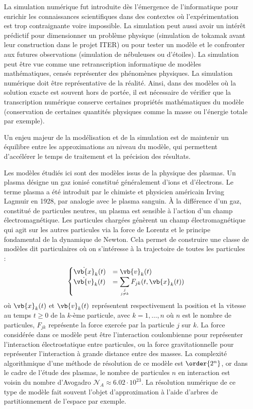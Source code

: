 
La simulation numérique fut introduite dès l’émergence de l’informatique pour enrichir les connaissances scientifiques dans des contextes où l’expérimentation est trop contraignante voire impossible. La simulation peut aussi avoir un intérêt prédictif pour dimensionner un problème physique (simulation de tokamak avant leur construction dans le projet ITER) ou pour tester un modèle et le confronter aux futures observations (simulation de nébuleuses ou d’étoiles). La simulation peut être vue comme une retranscription informatique de modèles mathématiques, censés représenter des phénomènes physiques. La simulation numérique doit être représentative de la réalité. Ainsi, dans des modèles où la solution exacte est souvent hors de portée, il est nécessaire de vérifier que la transcription numérique conserve certaines propriétés mathématiques du modèle (conservation de certaines quantités physiques comme la masse ou l’énergie totale par exemple).

Un enjeu majeur de la modélisation et de la simulation est de maintenir un équilibre entre les approximations au niveau du modèle, qui permettent d’accélérer le temps de traitement et la précision des résultats.

Les modèles étudiés ici sont des modèles issus de la physique des plasmas. Un plasma désigne un gaz ionisé constitué généralement d'ions et d'électrons. Le terme plasma a été introduit par le chimiste et physicien américain Irving Lagmuir en 1928, par analogie avec le plasma sanguin. À la différence d'un gaz, constitué de particules neutres, un plasma est sensible à l'action d'un champ électromagnétique. Les particules chargées génèrent un champ électromagnétique qui agit sur les autres particules via la force de Lorentz et le principe fondamental de la dynamique de Newton. Cela permet de construire une classe de modèles dit particulaires où on s'intéresse à la trajectoire de toutes les particules :
$$
  \begin{cases}
    \dot{\vb{x}}_k(t) &= \vb{v}_k(t) \\
    \dot{\vb{v}}_k(t) &= \displaystyle\sum_{j\atop j\neq k} F_{jk}(t,\vb{x}_k(t))
  \end{cases}
$$
où $\vb{x}_k(t)$ et $\vb{v}_k(t)$ représentent respectivement la position et la vitesse au temps $t\geq0$ de la $k$-ème particule, avec $k=1,\dots,n$ où $n$ est le nombre de particules, $F_{jk}$ représente la force exercée par la particule $j$ sur $k$. La force considérée dans ce modèle peut être l'interaction coulombienne pour représenter l'interaction électrostatique entre particules, ou la force gravitationnelle pour représenter l'interaction à grande distance entre des masses. La complexité algorithmique d'une méthode de résolution de ce modèle est $\order{2^n}$, or dans le cadre de l'étude des plasmas, le nombre de particules $n$ en interaction est voisin du nombre d'Avogadro $\mathcal{N}_A\approx 6.02\cdot 10^{23}$. La résolution numérique de ce type de modèle fait souvent l'objet d'approximation à l'aide d'arbres de partitionnement de l'espace par exemple.

